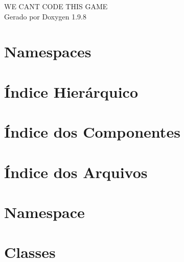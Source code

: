 \documentclass[twoside]{book}
\newcommand{\+}{\discretionary{\mbox{\scriptsize$\hookleftarrow$}}{}{}}
\newcommand{\clearemptydoublepage}{%
    \newpage{\pagestyle{empty}\cleardoublepage}%
  }
\begin{document}
  \raggedbottom
    \hypersetup{pageanchor=false,
                bookmarksnumbered=true,
                pdfencoding=unicode
               }
  \begin{titlepage}
  \vspace*{7cm}
  \begin{center}%
  {\Large WE CANT CODE THIS GAME}\\
  \vspace*{1cm}
  {\large Gerado por Doxygen 1.9.8}\\
  \end{center}
  \end{titlepage}
  \clearemptydoublepage
  \tableofcontents
  \clearemptydoublepage
  \hypersetup{pageanchor=true}

\chapter{Namespaces}

\chapter{Índice Hierárquico}

\chapter{Índice dos Componentes}

\chapter{Índice dos Arquivos}

\chapter{Namespace}






\chapter{Classes}






















\end{document}
